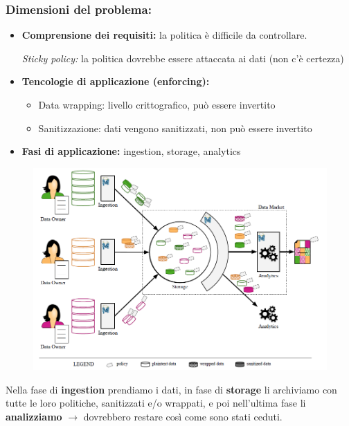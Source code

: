 \documentclass{report}
\begin{document}
\subsubsection{Dimensioni del problema:}
\begin{itemize}
    \item \textbf{Comprensione dei requisiti:} la politica è difficile da controllare. 
    
    \textit{Sticky policy:} la politica dovrebbe essere attaccata ai dati (non c'è certezza)
    \item \textbf{Tencologie di applicazione (enforcing):}
    \begin{itemize}
        \item Data wrapping: livello crittografico, può essere invertito
        \item Sanitizzazione: dati vengono sanitizzati, non può essere invertito
    \end{itemize}
    \item \textbf{Fasi di applicazione:} ingestion, storage, analytics
\end{itemize}

\begin{figure}[ht]
    \centering
    \includegraphics[width=1\linewidth]{images/i bellissimi dati.png}
\end{figure}
Nella fase di \textbf{ingestion} prendiamo i dati, in fase di \textbf{storage} li archiviamo con tutte le loro politiche, sanitizzati e/o wrappati, e poi 
nell'ultima fase li \textbf{analizziamo} $ \rightarrow$ dovrebbero restare così come sono stati ceduti. 
\end{document}
